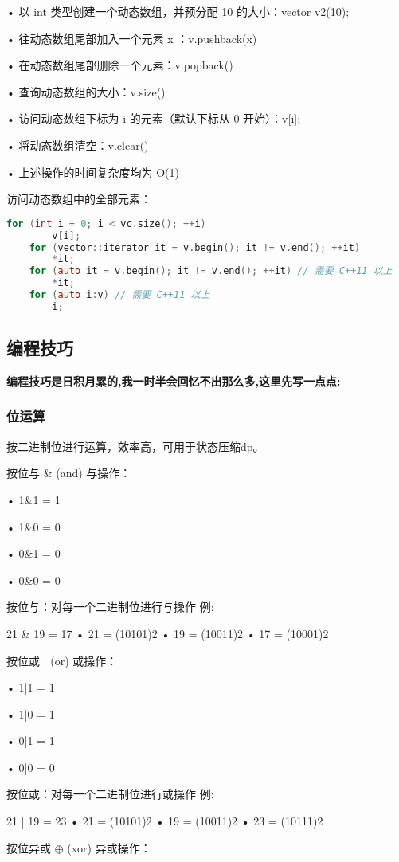 \documentclass[UTF8]{ctexart}
\begin{document}
• 以 int 类型创建一个动态数组，并预分配 10 的大小：vector v2(10); 

• 往动态数组尾部加入一个元素 x ：v.push\textunderscore back(x) 

• 在动态数组尾部删除一个元素：v.pop\textunderscore back() 

• 查询动态数组的大小：v.size() 

• 访问动态数组下标为 i 的元素（默认下标从 0 开始）：v[i]; 

• 将动态数组清空：v.clear() 

• 上述操作的时间复杂度均为 O(1)

访问动态数组中的全部元素：
\begin{lstlisting}[language = C,basicstyle=\small\ttfamily]
    for (int i = 0; i < vc.size(); ++i) 
        v[i]; 
    for (vector::iterator it = v.begin(); it != v.end(); ++it) 
        *it; 
    for (auto it = v.begin(); it != v.end(); ++it) // 需要 C++11 以上 
        *it; 
    for (auto i:v) // 需要 C++11 以上 
        i;
\end{lstlisting}

\subsection{编程技巧}
\textbf{编程技巧是日积月累的,我一时半会回忆不出那么多,这里先写一点点:}
\subsubsection{位运算}
按二进制位进行运算，效率高，可用于状态压缩dp。

按位与 \& (and) 与操作： 

• 1\&1 = 1 

• 1\&0 = 0

• 0\&1 = 0

• 0\&0 = 0 

按位与：对每一个二进制位进行与操作 例: 

21 \& 19 = 17 • 21 = (10101)2 • 19 = (10011)2 • 17 = (10001)2

按位或 | (or) 或操作： 

• 1|1 = 1 

• 1|0 = 1 

• 0|1 = 1 

• 0|0 = 0 

按位或：对每一个二进制位进行或操作 例: 

21 | 19 = 23 • 21 = (10101)2 • 19 = (10011)2 • 23 = (10111)2

按位异或 $\oplus$  (xor) 异或操作： 
\end{document}
